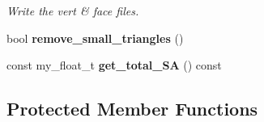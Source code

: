 \begin{CompactItemize}
\begin{CompactList}\small\item\em Write the vert \& face files. \item\end{CompactList}\item 
bool \textbf{remove\_\-small\_\-triangles} ()\label{classSimSite3D_1_1geometry_1_1SimpleTrimeshTwo_b0a5b063bc1990180216eb8971d08595}

\item 
const my\_\-float\_\-t \textbf{get\_\-total\_\-SA} () const \label{classSimSite3D_1_1geometry_1_1SimpleTrimeshTwo_5147d4bb728ecc4302a4750073d23e8a}

\end{CompactItemize}
\subsection*{Protected Member Functions}

